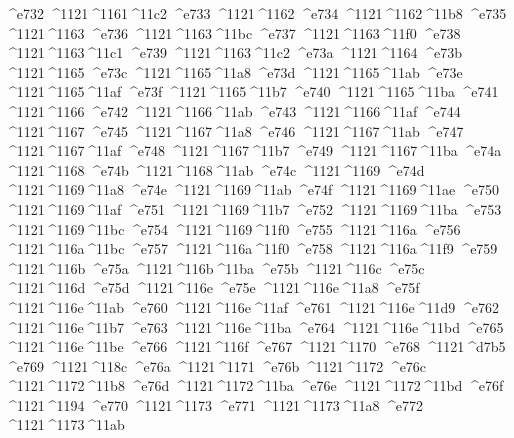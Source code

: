 \checkit ^^^^e732 ^^^^1121^^^^1161^^^^11c2
\checkit ^^^^e733 ^^^^1121^^^^1162
\checkit ^^^^e734 ^^^^1121^^^^1162^^^^11b8
\checkit ^^^^e735 ^^^^1121^^^^1163
\checkit ^^^^e736 ^^^^1121^^^^1163^^^^11bc
\checkit ^^^^e737 ^^^^1121^^^^1163^^^^11f0
\checkit ^^^^e738 ^^^^1121^^^^1163^^^^11c1
\checkit ^^^^e739 ^^^^1121^^^^1163^^^^11c2
\checkit ^^^^e73a ^^^^1121^^^^1164
\checkit ^^^^e73b ^^^^1121^^^^1165
\checkit ^^^^e73c ^^^^1121^^^^1165^^^^11a8
\checkit ^^^^e73d ^^^^1121^^^^1165^^^^11ab
\checkit ^^^^e73e ^^^^1121^^^^1165^^^^11af
\checkit ^^^^e73f ^^^^1121^^^^1165^^^^11b7
\checkit ^^^^e740 ^^^^1121^^^^1165^^^^11ba
\checkit ^^^^e741 ^^^^1121^^^^1166
\checkit ^^^^e742 ^^^^1121^^^^1166^^^^11ab
\checkit ^^^^e743 ^^^^1121^^^^1166^^^^11af
\checkit ^^^^e744 ^^^^1121^^^^1167
\checkit ^^^^e745 ^^^^1121^^^^1167^^^^11a8
\checkit ^^^^e746 ^^^^1121^^^^1167^^^^11ab
\checkit ^^^^e747 ^^^^1121^^^^1167^^^^11af
\checkit ^^^^e748 ^^^^1121^^^^1167^^^^11b7
\checkit ^^^^e749 ^^^^1121^^^^1167^^^^11ba
\checkit ^^^^e74a ^^^^1121^^^^1168
\checkit ^^^^e74b ^^^^1121^^^^1168^^^^11ab
\checkit ^^^^e74c ^^^^1121^^^^1169
\checkit ^^^^e74d ^^^^1121^^^^1169^^^^11a8
\checkit ^^^^e74e ^^^^1121^^^^1169^^^^11ab
\checkit ^^^^e74f ^^^^1121^^^^1169^^^^11ae
\checkit ^^^^e750 ^^^^1121^^^^1169^^^^11af
\checkit ^^^^e751 ^^^^1121^^^^1169^^^^11b7
\checkit ^^^^e752 ^^^^1121^^^^1169^^^^11ba
\checkit ^^^^e753 ^^^^1121^^^^1169^^^^11bc
\checkit ^^^^e754 ^^^^1121^^^^1169^^^^11f0
\checkit ^^^^e755 ^^^^1121^^^^116a
\checkit ^^^^e756 ^^^^1121^^^^116a^^^^11bc
\checkit ^^^^e757 ^^^^1121^^^^116a^^^^11f0
\checkit ^^^^e758 ^^^^1121^^^^116a^^^^11f9
\checkit ^^^^e759 ^^^^1121^^^^116b
\checkit ^^^^e75a ^^^^1121^^^^116b^^^^11ba
\checkit ^^^^e75b ^^^^1121^^^^116c
\checkit ^^^^e75c ^^^^1121^^^^116d
\checkit ^^^^e75d ^^^^1121^^^^116e
\checkit ^^^^e75e ^^^^1121^^^^116e^^^^11a8
\checkit ^^^^e75f ^^^^1121^^^^116e^^^^11ab
\checkit ^^^^e760 ^^^^1121^^^^116e^^^^11af
\checkit ^^^^e761 ^^^^1121^^^^116e^^^^11d9
\checkit ^^^^e762 ^^^^1121^^^^116e^^^^11b7
\checkit ^^^^e763 ^^^^1121^^^^116e^^^^11ba
\checkit ^^^^e764 ^^^^1121^^^^116e^^^^11bd
\checkit ^^^^e765 ^^^^1121^^^^116e^^^^11be
\checkit ^^^^e766 ^^^^1121^^^^116f
\checkit ^^^^e767 ^^^^1121^^^^1170
\checkit ^^^^e768 ^^^^1121^^^^d7b5
\checkit ^^^^e769 ^^^^1121^^^^118c
\checkit ^^^^e76a ^^^^1121^^^^1171
\checkit ^^^^e76b ^^^^1121^^^^1172
\checkit ^^^^e76c ^^^^1121^^^^1172^^^^11b8
\checkit ^^^^e76d ^^^^1121^^^^1172^^^^11ba
\checkit ^^^^e76e ^^^^1121^^^^1172^^^^11bd
\checkit ^^^^e76f ^^^^1121^^^^1194
\checkit ^^^^e770 ^^^^1121^^^^1173
\checkit ^^^^e771 ^^^^1121^^^^1173^^^^11a8
\checkit ^^^^e772 ^^^^1121^^^^1173^^^^11ab
